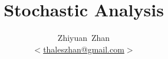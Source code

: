 \documentclass[a4paper,12pt]{report}
\title{Stochastic Analysis}
\author{Zhiyuan~Zhan\\ $<$\href{mailto:thaleszhan@gmail.com}%
            {thaleszhan@gmail.com}$>$}
\begin{document}
\maketitle
\tableofcontents

\begin{comment}










\end{comment}


%
\newpage
\printbibliography
\end{document}
